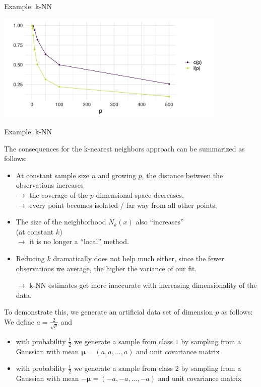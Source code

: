 \begin{vbframe}{Example: k-NN}
\begin{center}
\includegraphics[width = 11cm ]{figure_man/knn_constant.png}
\end{center}

\end{vbframe}
\begin{vbframe}{Example: k-NN}


The consequences for the k-nearest neighbors approach can be summarized as follows:

\begin{itemize}
 \item At constant sample size $n$ and growing $p$, the distance between the observations increases\\
 $\rightarrow$ the coverage of the $p$-dimensional space decreases,\\
 $\rightarrow$ every point becomes isolated / far way from all other points.
 \item The size of the neighborhood $N_k(x)$ also \enquote{increases}\\
       (at constant $k$) \\
       $\rightarrow$ it is no longer a \enquote{local} method.
 \item Reducing $k$ dramatically does not help much either,
since the fewer observations we average, the higher the variance of our fit.
 \item[$\rightarrow$] k-NN estimates get more inaccurate with increasing dimensionality of the data.
\end{itemize}

\framebreak

To demonstrate this, we generate an artificial data set of dimension $p$ as follows: We define $a = \frac{2}{\sqrt{p}}$ and 

\begin{itemize}
\item with probability $\frac{1}{2}$ we generate a sample from class $1$ by sampling from a Gaussian with mean $\pmb\mu = (a, a, ..., a)$ and unit covariance matrix
\item with probability $\frac{1}{2}$ we generate a sample from class $2$ by sampling from a  Gaussian with mean $- \pmb\mu = (-a, -a, ..., -a)$ and unit covariance matrix
\end{itemize}



\end{vbframe}
